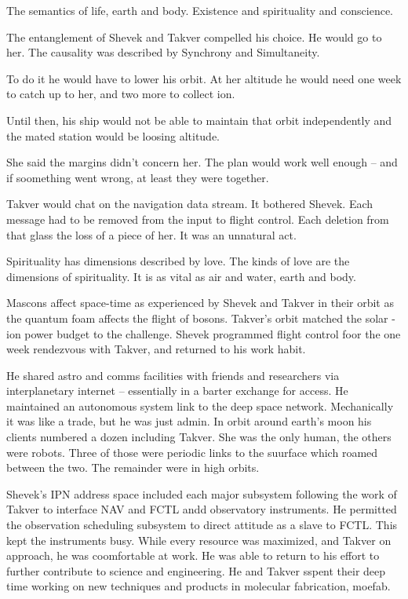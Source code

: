 
The semantics of life, earth and body.  Existence and spirituality and
conscience.  

The entanglement of Shevek and Takver compelled his choice.  He would
go to her.  The causality was described by Synchrony and Simultaneity.

To do it he would have to lower his orbit.  At her altitude he would
need one week to catch up to her, and two more to collect ion.

Until then, his ship would not be able to maintain that orbit
independently and the mated station would be loosing altitude.

She said the margins didn't concern her.  The plan would work well
enough -- and if soomething went wrong, at least they were together.


Takver would chat on the navigation data stream.  It bothered Shevek.
Each message had to be removed from the input to flight control.  Each
deletion from that glass the loss of a piece of her.  It was an
unnatural act.

Spirituality has dimensions described by love.  The kinds of love are
the dimensions of spirituality.  It is as vital as air and water,
earth and body.

Mascons affect space-time as experienced by Shevek and Takver in their
orbit as the quantum foam affects the flight of bosons.  Takver's
orbit matched the solar - ion power budget to the challenge.  Shevek
programmed flight control foor the one week rendezvous with Takver,
and returned to his work habit.

He shared astro and comms facilities with friends and researchers via
interplanetary internet -- essentially in a barter exchange for
access.  He maintained an autonomous system link to the deep space
network.  Mechanically it was like a trade, but he was just admin.  In
orbit around earth's moon his clients numbered a dozen including
Takver.  She was the only human, the others were robots.  Three of
those were periodic links to the suurface which roamed between the
two.  The remainder were in high orbits.

Shevek's IPN address space included each major subsystem following the
work of Takver to interface NAV and FCTL andd observatory instruments.
He permitted the observation scheduling subsystem to direct attitude
as a slave to FCTL.  This kept the instruments busy.  While every
resource was maximized, and Takver on approach, he was coomfortable at
work.  He was able to return to his effort to further contribute to
science and engineering.  He and Takver sspent their deep time working
on new techniques and products in molecular fabrication, moefab.

